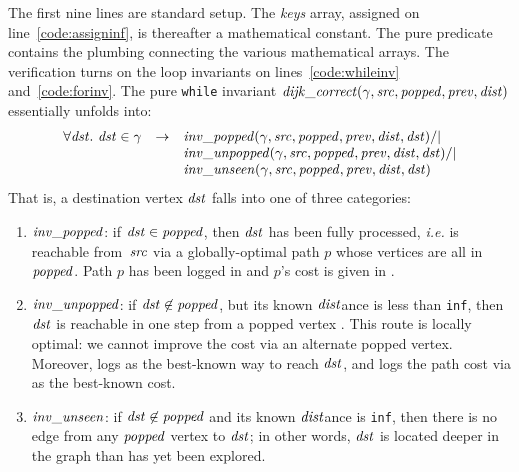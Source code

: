 The first nine lines are standard setup.
The \emph{keys} array, assigned on line~\ref{code:assigninf},
is thereafter a mathematical constant.
The pure predicate  contains the plumbing connecting the
various mathematical arrays.
The verification turns on the loop
invariants on lines~\ref{code:whileinv} and~\ref{code:forinv}.  The pure \texttt{while} invariant $\mathit{dijk\_correct}(\gamma, \mathit{src}, \mathit{popped}, \mathit{prev}, \mathit{dist})$ essentially unfolds into:
\[
\begin{array}{lcl}
\forall \m{dst}.~\m{dst} \in \gamma & -> & \m{inv\_popped}(\gamma, \m{src}, \m{popped}, \m{prev}, \m{dist}, \m{dst}) /| \null \\
&&\m{inv\_unpopped}(\gamma, \m{src}, \m{popped}, \m{prev}, \m{dist}, \m{dst}) /| \null \\
&&\m{inv\_unseen}(\gamma, \m{src}, \m{popped}, \m{prev}, \m{dist}, \m{dst})
\end{array}
\]
That is, a destination vertex $\mathit{dst}$ falls into one of three
categories:
\begin{enumerate}
\item $\mathit{inv\_popped}$: if $\mathit{dst} \in \mathit{popped}$, 
then $\mathit{dst}$ has been fully processed, \emph{i.e.}  is reachable from~$\mathit{src}$
via a globally-optimal path $p$ whose vertices are all in $\mathit{popped}$.  Path $p$ has been logged in  and $p$'s cost is given in .


\item $\mathit{inv\_unpopped}$: if $\mathit{dst} \not \in \mathit{popped}$, but its known $\mathit{dist}$ance is less than
\texttt{inf}, then $\mathit{dst}$ is reachable in one step from a popped vertex .
This route is locally optimal: we cannot improve the cost via an alternate popped vertex.
Moreover,  logs
 as the best-known way to reach $\mathit{dst}$, and 
logs the path cost via  as the best-known cost.
\item $\mathit{inv\_unseen}$: if $\mathit{dst} \not \in \mathit{popped}$ and its known $\mathit{dist}$ance is \texttt{inf}, then
there is no edge from any $\mathit{popped}$ vertex to $\mathit{dst}$; in other words, $\mathit{dst}$ is located deeper in the graph
than has yet been explored.
\end{enumerate}
